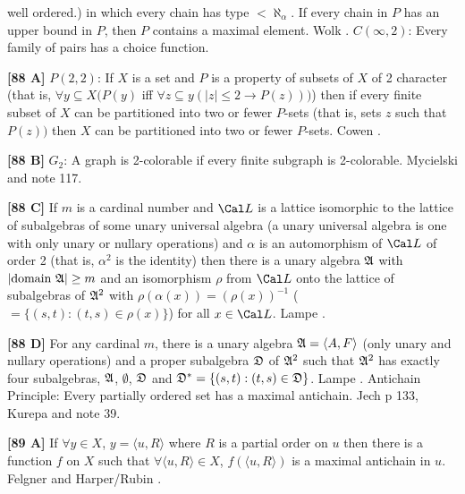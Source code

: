 well ordered.) in which every chain has type $< \aleph_{\alpha}$. If
every chain in $P$ has an upper bound in $P$, then $P$ contains a
maximal element. \ac{Wolk} \cite{1983}.
\medskip
{}  $C(\infty ,2)$:  Every family of pairs has a
choice function.
\smallskip
\item{}{\bf [88 A]}  $P(2,2)$:  If $X$ is a set and $P$ is a property of
subsets of $X$ of 2 character (that is, $\forall y\subseteq X (P(y)$ iff
$\forall z\subseteq y (|z|\le 2 \rightarrow P(z)))$) then if every finite
subset of $X$ can be partitioned into two or fewer $P$-sets (that is, sets
$z$ such that $P(z))$ then $X$ can be partitioned into two or fewer
$P$-sets.  \ac{Cowen} \cite{1982}.
\smallskip
\item{}{\bf [88 B]}  $G_{2}$: A graph is 2-colorable if every  finite
subgraph is 2-colorable.  \ac{Mycielski} \cite{1961} and note 117.
\smallskip
\item{}{\bf [88 C]} If $m$ is a cardinal number and ${\Cal L}$ is a
lattice isomorphic  to  the  lattice  of  subalgebras of some unary
universal algebra (a unary universal algebra is one with  only
unary or nullary operations) and $\alpha$ is an automorphism of ${\Cal L}$
of order 2 (that is, $\alpha ^{2}$ is the  identity) then there is a unary
algebra $\frak A$  with $|\hbox{domain }\frak A| \ge m$ and an
isomorphism $\rho$ from ${\Cal L}$ onto the lattice of subalgebras of
$\frak A^{2}$ with $\rho (\alpha (x)) = (\rho (x))^{-1}$ ($=
\{(s,t) : (t,s)\in \rho (x)\}$) for all $x\in {\Cal L}$. \ac{Lampe}
\cite{1974}.
\smallskip
\item{}{\bf [88 D]} For any cardinal $m$, there is a unary algebra $\frak A
= \langle A,F\rangle$ (only unary and nullary operations) and a proper
subalgebra $\frak D$ of $\frak A^{2}$ such that $\frak A^{2}$ has
exactly four subalgebras, $\frak A$, $\emptyset$, $\frak D$
and $\frak D^{*}= \{(s,t): (t,s)\in\frak D\}$.  \ac{Lampe} \cite{1974}.
\medskip
{} Antichain Principle:  Every partially ordered
set has a maximal antichain. \ac{Jech} \cite{1973b} p 133, \ac{Kurepa}
\cite{1953} and note 39.  
\smallskip
\item{}{\bf [89 A]}  If $\forall y\in X$, $y = \langle u,R\rangle$ where
$R$ is a partial order on $u$ then there is a function $f$ on $X$ such that
$\forall\langle u,R\rangle\in X$, $f(\langle u,R\rangle)$ is a maximal
antichain in $u$.  \ac{Felgner} \cite{1969} and \ac{Harper/Rubin}
\cite{1976}.

